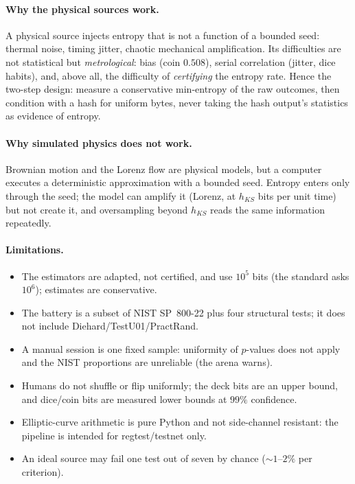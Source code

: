 \documentclass[11pt,a4paper]{article}
\theoremstyle{plain}
\theoremstyle{definition}
\begin{document}
\paragraph{Why the physical sources work.} A physical source injects entropy
that is not a function of a bounded seed: thermal noise, timing jitter,
chaotic mechanical amplification. Its difficulties are not statistical but
\emph{metrological}: bias (coin $0.508$), serial correlation (jitter, dice
habits), and, above all, the difficulty of \emph{certifying} the entropy rate.
Hence the two-step design: measure a conservative min-entropy of the raw
outcomes, then condition with a hash for uniform bytes, never taking the hash
output's statistics as evidence of entropy.

\paragraph{Why simulated physics does not work.} Brownian motion and the Lorenz
flow are physical models, but a computer executes a deterministic
approximation with a bounded seed. Entropy enters only through the seed; the
model can amplify it (Lorenz, at $h_{KS}$ bits per unit time) but not create
it, and oversampling beyond $h_{KS}$ reads the same information repeatedly.

\paragraph{Limitations.}
\begin{itemize}[leftmargin=1.4em]
    \item The estimators are adapted, not certified, and use $10^5$ bits
          (the standard asks $10^6$); estimates are conservative.
    \item The battery is a subset of NIST SP~800-22 plus four structural tests;
          it does not include Diehard/TestU01/PractRand.
    \item A manual session is one fixed sample: uniformity of $p$-values does not
          apply and the NIST proportions are unreliable (the arena warns).
    \item Humans do not shuffle or flip uniformly; the deck bits are an upper
          bound, and dice/coin bits are measured lower bounds at $99\%$ confidence.
    \item Elliptic-curve arithmetic is pure Python and not side-channel
          resistant: the pipeline is intended for regtest/testnet only.
    \item An ideal source may fail one test out of seven by chance ($\sim1$--$2\%$
          per criterion).
\end{itemize}
\end{document}
